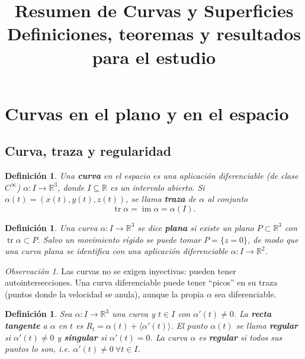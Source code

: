\documentclass[11pt]{article}
\title{\textbf{Resumen de Curvas y Superficies}\\[2mm]\large Definiciones, teoremas y resultados para el estudio}
\author{}
\date{}
\DeclareMathOperator{\tr}{tr}
\DeclareMathOperator{\im}{im}
\theoremstyle{plain}
\newtheorem{definicion}[teorema]{Definición}
\theoremstyle{definition}
\theoremstyle{remark}
\newtheorem{observacion}[teorema]{Observación}
\begin{document}
\maketitle
\vspace{-1cm}
\tableofcontents

\newpage

\section{Curvas en el plano y en el espacio}

\subsection{Curva, traza y regularidad}

\begin{definicion}
Una \textbf{curva} en el espacio es una aplicación diferenciable (de clase $C^\infty$) $\alpha:I\to\mathbb{R}^3$, donde $I\subseteq\mathbb{R}$ es un intervalo abierto. Si $\alpha(t)=(x(t),y(t),z(t))$, se llama \textbf{traza} de $\alpha$ al conjunto
\[
\tr\alpha=\im\alpha=\alpha(I).
\]
\end{definicion}

\begin{definicion}
Una curva $\alpha:I\to\mathbb{R}^3$ se dice \textbf{plana} si existe un plano $P\subset\mathbb{R}^3$ con $\tr\alpha\subset P$. Salvo un movimiento rígido se puede tomar $P=\{z=0\}$, de modo que una curva plana se identifica con una aplicación diferenciable $\alpha:I\to\mathbb{R}^2$.
\end{definicion}

\begin{observacion}
Las curvas no se exigen inyectivas: pueden tener autointersecciones. Una curva diferenciable puede tener ``picos'' en su traza (puntos donde la velocidad se anula), aunque la propia $\alpha$ sea diferenciable.
\end{observacion}

\begin{definicion}
Sea $\alpha:I\to\mathbb{R}^3$ una curva y $t\in I$ con $\alpha'(t)\neq0$. La \textbf{recta tangente} a $\alpha$ en $t$ es $R_t=\alpha(t)+\langle\alpha'(t)\rangle$. El punto $\alpha(t)$ se llama \textbf{regular} si $\alpha'(t)\neq0$ y \textbf{singular} si $\alpha'(t)=0$. La curva $\alpha$ es \textbf{regular} si todos sus puntos lo son, i.e. $\alpha'(t)\neq0\ \forall t\in I$.
\end{definicion}
\end{document}
